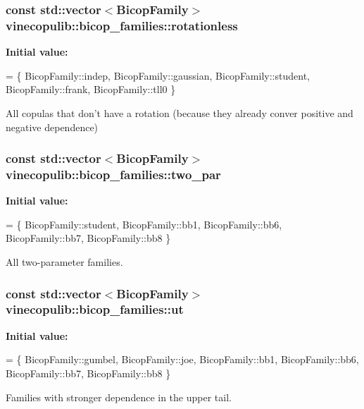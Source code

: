 \hypertarget{namespacevinecopulib_1_1bicop__families_ac221bc84c32d2836692ed40d89439928}{
\subsubsection[{rotationless}]{\setlength{\rightskip}{0pt plus 5cm}const std\+::vector$<${\bf Bicop\+Family}$>$ vinecopulib\+::bicop\+\_\+families\+::rotationless}}\label{namespacevinecopulib_1_1bicop__families_ac221bc84c32d2836692ed40d89439928}
{\bfseries Initial value\+:}
\begin{DoxyCode}
= \{
            BicopFamily::indep, 
            BicopFamily::gaussian, 
            BicopFamily::student, 
            BicopFamily::frank, 
            BicopFamily::tll0
        \}
\end{DoxyCode}
All copulas that don't have a rotation (because they already conver positive and negative dependence) \hypertarget{namespacevinecopulib_1_1bicop__families_ad5871c39b4ee62bd44fa851d7d70c7ca}{
\subsubsection[{two\+\_\+par}]{\setlength{\rightskip}{0pt plus 5cm}const std\+::vector$<${\bf Bicop\+Family}$>$ vinecopulib\+::bicop\+\_\+families\+::two\+\_\+par}}\label{namespacevinecopulib_1_1bicop__families_ad5871c39b4ee62bd44fa851d7d70c7ca}
{\bfseries Initial value\+:}
\begin{DoxyCode}
= \{
            BicopFamily::student,
            BicopFamily::bb1, 
            BicopFamily::bb6, 
            BicopFamily::bb7, 
            BicopFamily::bb8
        \}
\end{DoxyCode}


All two-\/parameter families. 

\hypertarget{namespacevinecopulib_1_1bicop__families_af754a2d2697709c204dda0473215f9cd}{
\subsubsection[{ut}]{\setlength{\rightskip}{0pt plus 5cm}const std\+::vector$<${\bf Bicop\+Family}$>$ vinecopulib\+::bicop\+\_\+families\+::ut}}\label{namespacevinecopulib_1_1bicop__families_af754a2d2697709c204dda0473215f9cd}
{\bfseries Initial value\+:}
\begin{DoxyCode}
= \{
            BicopFamily::gumbel, 
            BicopFamily::joe, 
            BicopFamily::bb1, 
            BicopFamily::bb6, 
            BicopFamily::bb7, 
            BicopFamily::bb8
        \}
\end{DoxyCode}


Families with stronger dependence in the upper tail. 

